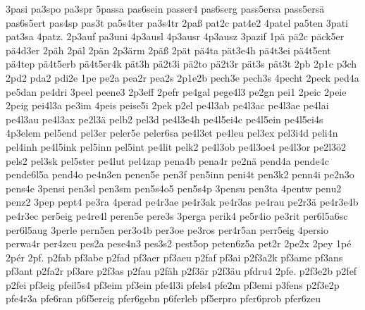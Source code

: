 {    3pasi
    pa3spo
    pa3spr
    5passa
    pas6sein
    passer4
    pas6serg
    pass5ersa
    pass5ersä
    pas6s5ert
    pas4sp
    pas3t
    pa5s4ter
    pa3s4tr
    2paß
    pat2c
    pat4e2
    4patel
    pa5ten
    3pati
    pat3sa
    4patz.
    2p3auf
    pa3uni
    4p3ausl
    4p3ausr
    4p3ausz
    3pazif
    1pä
    pä2c
    päck5er
    pä4d3er
    2päh
    2päl
    2pän
    2p3ärm
    2päß
    2pät
    pä4ta
    pät3e4h
    pä4t3ei
    pä4t5ent
    pä4tep
    pä4t5erb
    pä4t5er4k
    pät3h
    pä2t3i
    pä2to
    pä2t3r
    pät3s
    pät3t
    2pb
    2p1c
    p3ch
    2pd2
    pda2
    pdi2e
    1pe
    pe2a
    pea2r
    pea2s
    2p1e2b
    pech3e
    pech3s
    4pecht
    2peck
    ped4a
    pe5dan
    pe4dri
    3peel
    peene3
    2p3eff
    2pefr
    pe4gal
    pege4l3
    pe2gn
    pei1
    2peic
    2peie
    2peig
    pei4l3a
    pe3im
    4peis
    peise5i
    2pek
    p2el
    pe4l3ab
    pe4l3ac
    pe4l3ae
    pe4lai
    pe4l3au
    pe4l3ax
    pe2l3ä
    pelb2
    pel3d
    pe4l3e4h
    pe4l5ei4c
    pe4l5ein
    pe4l5ei4s
    4p3elem
    pel5end
    pel3er
    peler5e
    peler6sa
    pe4l3et
    pe4leu
    pel3ex
    pel3i4d
    peli4n
    pel4inh
    pe4l5ink
    pel5inn
    pel5int
    pe4lit
    pelk2
    pe4l3ob
    pe4l3oe4
    pe4l3or
    pe2l3ö2
    pels2
    pel3sk
    pel5ster
    pe4lut
    pel4zap
    pena4b
    pena4r
    pe2nä
    pend4a
    pende4c
    pende6l5a
    pend4o
    pe4n3en
    penen5e
    pen3f
    pen5inn
    peni4t
    pen3k2
    penn4i
    pe2n3o
    pens4e
    3pensi
    pen3sl
    pen3sm
    pen5s4o5
    pen5s4p
    3pensu
    pen3ta
    4pentw
    penu2
    penz2
    3pep
    pept4
    pe3ra
    4perad
    pe4r3ae
    pe4r3ak
    pe4r3as
    pe4rau
    pe2r3ä
    pe4r3e4b
    pe4r3ec
    per5eig
    pe4re4l
    peren5e
    pere3s
    3perga
    perik4
    pe5r4io
    pe3rit
    per6l5a6sc
    per6l5aug
    3perle
    pern5en
    per3o4b
    per3oe
    pe3ros
    per4r5an
    perr5eig
    4persio
    perwa4r
    per4zeu
    pes2a
    pese4n3
    pes3s2
    pest5op
    peten6z5a
    pet2r
    2pe2x
    2pey
    1pé
    2pér
    2pf.
    p2fab
    pf3abe
    p2fad
    pf3aer
    pf3aeu
    p2faf
    pf3ai
    p2f3a2k
    pf3ame
    pf3ans
    pf3ant
    p2fa2r
    pf3are
    p2f3as
    p2fau
    p2fäh
    p2f3är
    p2f3äu
    pfdru4
    2pfe.
    p2f3e2b
    p2fef
    p2fei
    pf3eig
    pfeil5s4
    pf3eim
    pf3ein
    pfe4l3i
    pfels4
    pfe2m
    pf3emi
    p3fens
    p2f3e2p
    pfe4r3a
    pfe6ran
    p6f5ereig
    pfer6gebn
    p6ferleb
    pf5erpro
    pfer6prob
    pfer6zeu
}
